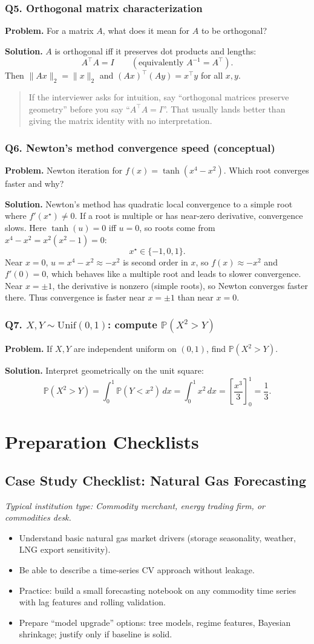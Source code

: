 \documentclass[11pt,letterpaper,openany]{book}
\newcommand{\RoleProfile}[2]{%
  \subsection{#1}%
  \noindent\textit{Typical institution type: #2.}\par
}
\newcommand{\prompt}[1]{\subsubsection*{#1}}
\newcommand{\playbooknote}[1]{\begin{quote}\small #1\end{quote}}
\begin{document}
\prompt{Q5. Orthogonal matrix characterization}
\textbf{Problem.} For a matrix $A$, what does it mean for $A$ to be orthogonal?

\textbf{Solution.} $A$ is orthogonal iff it preserves dot products and lengths:
\[
  A^\top A = I
  \qquad
  (\text{equivalently } A^{-1} = A^\top).
\]
Then $\lVert Ax \rVert_2 = \lVert x \rVert_2$ and $(Ax)^\top(Ay) = x^\top y$ for all $x,y$.
\playbooknote{If the interviewer asks for intuition, say ``orthogonal matrices preserve geometry'' before you say ``$A^\top A = I$''. That usually lands better than giving the matrix identity with no interpretation.}

\prompt{Q6. Newton's method convergence speed (conceptual)}
\textbf{Problem.} Newton iteration for $f(x) = \tanh(x^4 - x^2)$. Which root converges faster and why?

\textbf{Solution.} Newton's method has quadratic local convergence to a simple root where $f'(x^\star) \ne 0$. If a root is multiple or has near-zero derivative, convergence slows. Here $\tanh(u) = 0$ iff $u = 0$, so roots come from $x^4 - x^2 = x^2(x^2 - 1) = 0$:
\[
  x^\star \in \{-1,0,1\}.
\]
Near $x = 0$, $u = x^4 - x^2 \approx -x^2$ is second order in $x$, so $f(x) \approx -x^2$ and $f'(0) = 0$, which behaves like a multiple root and leads to slower convergence. Near $x = \pm 1$, the derivative is nonzero (simple roots), so Newton converges faster there. Thus convergence is faster near $x = \pm 1$ than near $x = 0$.

\prompt{Q7. $X, Y \sim \mathrm{Unif}(0,1)$: compute $\mathbb{P}(X^2 > Y)$}
\textbf{Problem.} If $X,Y$ are independent uniform on $(0,1)$, find $\mathbb{P}(X^2 > Y)$.

\textbf{Solution.} Interpret geometrically on the unit square:
\[
  \mathbb{P}(X^2 > Y) = \int_0^1 \mathbb{P}(Y < x^2)\,dx = \int_0^1 x^2\,dx = \left[\frac{x^3}{3}\right]_0^1 = \frac13.
\]

\section{Preparation Checklists}

\RoleProfile{Case Study Checklist: Natural Gas Forecasting}{Commodity merchant, energy trading firm, or commodities desk}
\begin{itemize}
  \item Understand basic natural gas market drivers (storage seasonality, weather, LNG export sensitivity).
  \item Be able to describe a time-series CV approach without leakage.
  \item Practice: build a small forecasting notebook on any commodity time series with lag features and rolling validation.
  \item Prepare ``model upgrade'' options: tree models, regime features, Bayesian shrinkage; justify only if baseline is solid.
\end{itemize}
\end{document}
